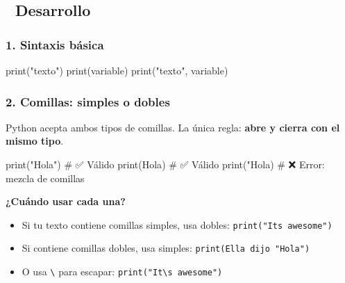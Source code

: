\documentclass[
  doc,
  floatsintext,
  longtable,
  a4paper,
  nolmodern,
  notxfonts,
  notimes,
  12pt,
  colorlinks=true,linkcolor=blue,citecolor=blue,urlcolor=blue]{apa7}
\newenvironment{Shaded}{\begin{snugshade}}{\end{snugshade}}
\newcommand{\BuiltInTok}[1]{\textcolor[rgb]{0.00,0.23,0.31}{#1}}
\newcommand{\CommentTok}[1]{\textcolor[rgb]{0.37,0.37,0.37}{#1}}
\newcommand{\NormalTok}[1]{\textcolor[rgb]{0.00,0.23,0.31}{#1}}
\newcommand{\StringTok}[1]{\textcolor[rgb]{0.13,0.47,0.30}{#1}}
\providecommand{\tightlist}{%
  \setlength{\itemsep}{0pt}\setlength{\parskip}{0pt}}
\begin{document}
\subsection{📐 Desarrollo}\label{desarrollo}

\subsubsection{1. Sintaxis básica}\label{sintaxis-buxe1sica}

\begin{Shaded}
\begin{Highlighting}[]
\BuiltInTok{print}\NormalTok{(}\StringTok{"texto"}\NormalTok{)}
\BuiltInTok{print}\NormalTok{(variable)}
\BuiltInTok{print}\NormalTok{(}\StringTok{"texto"}\NormalTok{, variable)}
\end{Highlighting}
\end{Shaded}

\subsubsection{2. Comillas: simples o
dobles}\label{comillas-simples-o-dobles}

Python acepta ambos tipos de comillas. La única regla: \textbf{abre y
cierra con el mismo tipo}.

\begin{Shaded}
\begin{Highlighting}[]
\BuiltInTok{print}\NormalTok{(}\StringTok{"Hola"}\NormalTok{)      }\CommentTok{\# ✅ Válido}
\BuiltInTok{print}\NormalTok{(}\StringTok{\textquotesingle{}Hola\textquotesingle{}}\NormalTok{)      }\CommentTok{\# ✅ Válido}
\BuiltInTok{print}\NormalTok{(}\StringTok{"Hola\textquotesingle{})      \# ❌ Error: mezcla de comillas}
\end{Highlighting}
\end{Shaded}

\textbf{¿Cuándo usar cada una?}

\begin{itemize}
\tightlist
\item
  Si tu texto contiene comillas simples, usa dobles:
  \texttt{print("It\textquotesingle{}s\ awesome")}
\item
  Si contiene comillas dobles, usa simples:
  \texttt{print(\textquotesingle{}Ella\ dijo\ "Hola"\textquotesingle{})}
\item
  O usa \texttt{\textbackslash{}} para escapar:
  \texttt{print("It\textbackslash{}\textquotesingle{}s\ awesome")}
\end{itemize}
\end{document}
